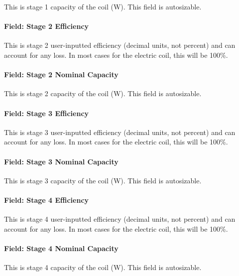 This is stage 1 capacity of the coil (W). This field is autosizable.

\paragraph{Field: Stage 2 Efficiency}\label{field-stage-2-efficiency}

This is stage 2 user-inputted efficiency (decimal units, not percent) and can account for any loss. In most cases for the electric coil, this will be 100\%.

\paragraph{Field: Stage 2 Nominal Capacity}\label{field-stage-2-nominal-capacity}

This is stage 2 capacity of the coil (W). This field is autosizable.

\paragraph{Field: Stage 3 Efficiency}\label{field-stage-3-efficiency}

This is stage 3 user-inputted efficiency (decimal units, not percent) and can account for any loss. In most cases for the electric coil, this will be 100\%.

\paragraph{Field: Stage 3 Nominal Capacity}\label{field-stage-3-nominal-capacity}

This is stage 3 capacity of the coil (W). This field is autosizable.

\paragraph{Field: Stage 4 Efficiency}\label{field-stage-4-efficiency}

This is stage 4 user-inputted efficiency (decimal units, not percent) and can account for any loss. In most cases for the electric coil, this will be 100\%.

\paragraph{Field: Stage 4 Nominal Capacity}\label{field-stage-4-nominal-capacity}

This is stage 4 capacity of the coil (W). This field is autosizable.

